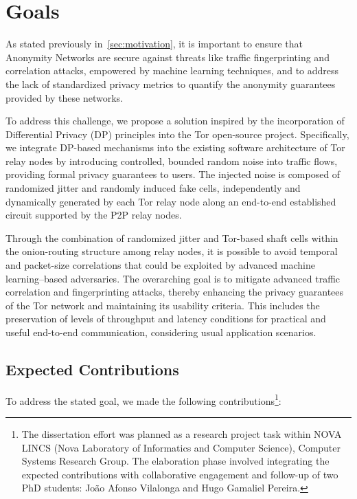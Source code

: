 \section{Goals}\label{sec:goals}

As stated previously in~\cref{sec:motivation}, it is important to ensure that Anonymity Networks are secure against threats like traffic fingerprinting and correlation attacks, empowered by machine learning techniques, and to address the lack of standardized privacy metrics to quantify the anonymity guarantees provided by these networks.

To address this challenge, we propose a solution inspired by the incorporation of Differential Privacy (DP) principles into the Tor open-source project. Specifically, we integrate DP-based mechanisms into the existing software architecture of Tor relay nodes by introducing controlled, bounded random noise into traffic flows, providing formal privacy guarantees to users. The injected noise is composed of randomized jitter and randomly induced fake cells, independently and dynamically generated by each Tor relay node along an end-to-end established circuit supported by the P2P relay nodes.

Through the combination of randomized jitter and Tor-based shaft cells within the onion-routing structure among relay nodes, it is possible to avoid temporal and packet-size correlations that could be exploited by advanced machine learning–based adversaries. The overarching goal is to mitigate advanced traffic correlation and fingerprinting attacks, thereby enhancing the privacy guarantees of the Tor network and maintaining its usability criteria. This includes the preservation of levels of throughput and latency conditions for practical and useful end-to-end communication, considering usual application scenarios.

\subsection{Expected Contributions}\label{sub:contributions}

To address the stated goal, we made the following contributions\footnote{The dissertation effort was planned as a research project task within NOVA LINCS (Nova Laboratory of Informatics and Computer Science), Computer Systems Research Group. The elaboration phase involved integrating the expected contributions with collaborative engagement and follow-up of two PhD students: João Afonso Vilalonga and Hugo Gamaliel Pereira.}:

